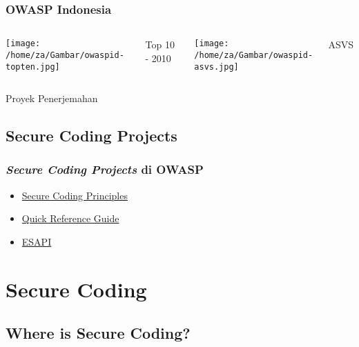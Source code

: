 \documentclass[xcolor=pdftex,table,handouts]{beamer}
\begin{document}
\begin{frame}
	\frametitle{OWASP Indonesia}
	\begin{center}	
	\begin{columns}			
			\texttt{[image: /home/za/Gambar/owaspid-topten.jpg]}
			\\ \begin{center}
					Top 10 - 2010
				\end{center} 		
			\texttt{[image: /home/za/Gambar/owaspid-asvs.jpg]}
			\\ \begin{center}
					ASVS
				\end{center}
	\end{columns}
	\vskip1cm Proyek Penerjemahan
	\end{center}
\end{frame}

\subsection{Secure Coding Projects}

\begin{frame}
	\frametitle{\textit{Secure Coding Projects} di OWASP}
	\begin{itemize}
		\item {\href{https://www.owasp.org/index.php/Secure_Coding_Principles}{Secure Coding Principles}}
		\item {\href{https://www.owasp.org/index.php/OWASP_Secure_Coding_Practices_-_Quick_Reference_Guide}{Quick Reference Guide}}
		\item {\href{https://www.owasp.org/index.php/Category:OWASP_Enterprise_Security_API}{ESAPI}}
	\end{itemize}
\end{frame}

\section{Secure Coding}
\subsection{Where is Secure Coding?}


\end{document}
